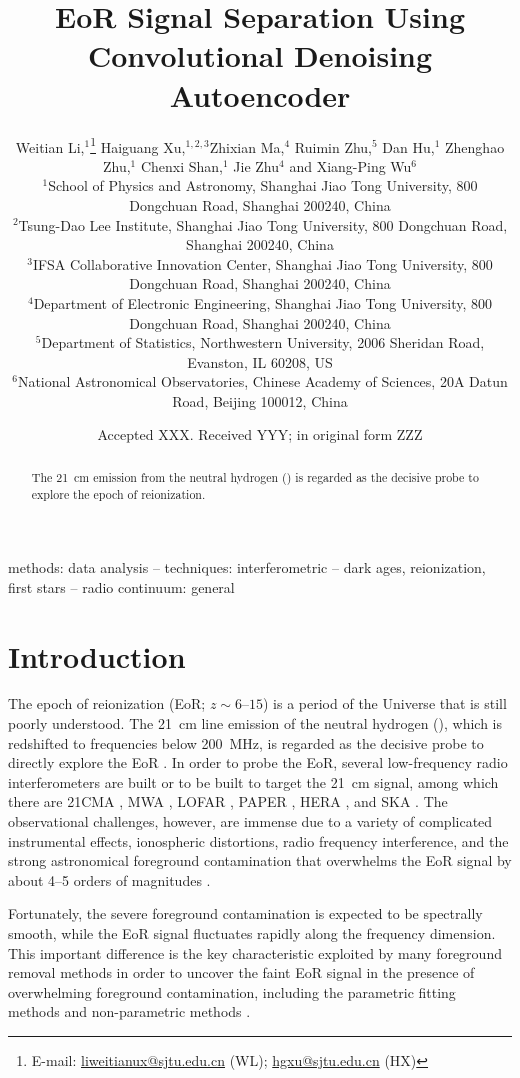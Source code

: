\documentclass[letters,a4paper,fleqn,usenatbib]{mnras}
\title[EoR Separation with CDAE]{%
  EoR Signal Separation Using Convolutional Denoising Autoencoder
}
\author[Li~et~al.]{%
Weitian Li,$^{1}$\thanks{E-mail:
  \href{mailto:liweitianux@sjtu.edu.cn}{liweitianux@sjtu.edu.cn} (WL);
  \href{mailto:hgxu@sjtu.edu.cn}{hgxu@sjtu.edu.cn} (HX)}
Haiguang Xu,$^{1,2,3}$\footnotemark[1]
Zhixian Ma,$^{4}$
Ruimin Zhu,$^{5}$
Dan Hu,$^{1}$
Zhenghao Zhu,$^{1}$
\newauthor
Chenxi Shan,$^{1}$
Jie Zhu$^{4}$
and
Xiang-Ping Wu$^{6}$
\\
$^{1}${School of Physics and Astronomy,
  Shanghai Jiao Tong University,
  800 Dongchuan Road, Shanghai 200240, China} \\
$^{2}${Tsung-Dao Lee Institute,
  Shanghai Jiao Tong University,
  800 Dongchuan Road, Shanghai 200240, China} \\
$^{3}${IFSA Collaborative Innovation Center,
  Shanghai Jiao Tong University,
  800 Dongchuan Road, Shanghai 200240, China} \\
$^{4}${Department of Electronic Engineering,
  Shanghai Jiao Tong University,
  800 Dongchuan Road, Shanghai 200240, China} \\
$^{5}${Department of Statistics,
  Northwestern University,
  2006 Sheridan Road, Evanston, IL 60208, US} \\
$^{6}${National Astronomical Observatories,
  Chinese Academy of Sciences,
  20A Datun Road, Beijing 100012, China}
}
\date{Accepted XXX. Received YYY; in original form ZZZ}
\newcommand{\Hi}{\ion{H}{i}}
\begin{document}
\label{firstpage}
\pagerange{\pageref{firstpage}--\pageref{lastpage}}
\maketitle

%
%
\begin{abstract}
The \SI{21}{\cm} emission from the neutral hydrogen ()
is regarded as the decisive probe to explore the epoch of reionization.
\end{abstract}

\begin{keywords}
methods: data analysis --
techniques: interferometric --
dark ages, reionization, first stars --
radio continuum: general
\end{keywords}



\section{Introduction}
\label{sec:intro}

The epoch of reionization (EoR; $z \sim \numrange{6}{15}$) is a period
of the Universe that is still poorly understood.
The \SI{21}{\cm} line emission of the neutral hydrogen (\Hi), which is
redshifted to frequencies below \SI{200}{\MHz}, is regarded as the
decisive probe to directly explore the EoR
\citep[see][for reviews]{furlanetto2006rev,furlanetto2016rev}.
In order to probe the EoR, several low-frequency radio interferometers
are built or to be built to target the \SI{21}{\cm} signal, among which
there are 21CMA \citep{zheng2016}, MWA \citep{tingay2013},
LOFAR \citep{vanHaarlem2013}, PAPER \citep{parsons2010},
HERA \citep{deboer2017}, and SKA \citep{koopmans2015rev}.
The observational challenges, however, are immense due to a variety of
complicated instrumental effects, ionospheric distortions, radio frequency
interference, and the strong astronomical foreground contamination that
overwhelms the EoR signal by about \numrange{4}{5} orders of magnitudes
\citep[see][for a review]{morales2010rev}.

Fortunately, the severe foreground contamination is expected to be
spectrally smooth, while the EoR signal fluctuates rapidly along the
frequency dimension.
This important difference is the key characteristic exploited by many
foreground removal methods in order to uncover the faint EoR signal in
the presence of overwhelming foreground contamination, including the
parametric fitting methods \citep[e.g.,][]{wang2006,liu2009fgrm,wang2013}
and non-parametric methods \citep[e.g.,][]{harker2009,chapman2013,mertens2018}.
\end{document}

